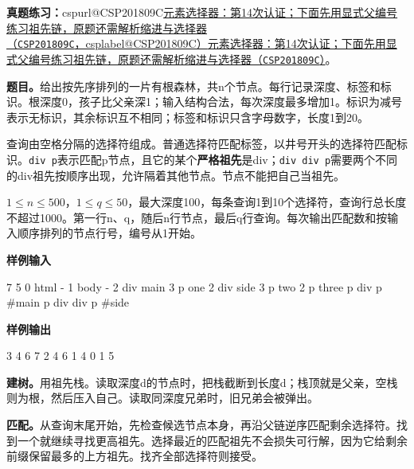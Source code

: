 \documentclass[UTF8,11pt,a4paper,fontset=none]{ctexart}
\makeatletter
\newcommand{\csp}[2]{\ifcsname cspurl@#1\endcsname\href{\csname cspurl@#1\endcsname}{#2（\texttt{#1}，\csname csplabel@#1\endcsname）}\else\href{https://oj.shumeng.tech/p/#1}{#2（\texttt{#1}）}\fi}
\newcommand{\ojpractice}[2]{\par\noindent\textbf{真题练习：}\csp{#1}{#2}。\par}
\makeatother
\begin{document}
\ojpractice{CSP201809C}{元素选择器：第14次认证；下面先用显式父编号练习祖先链，原题还需解析缩进与选择器}

\noindent\textbf{题目。}给出按先序排列的一片有根森林，共n个节点。每行记录深度、标签和标识。根深度0，孩子比父亲深1；输入结构合法，每次深度最多增加1。标识为减号表示无标识，其余标识互不相同；标签和标识只含字母数字，长度1到20。

查询由空格分隔的选择符组成。普通选择符匹配标签，以井号开头的选择符匹配标识。\texttt{div p}表示匹配p节点，且它的某个\textbf{严格祖先}是div；\texttt{div div p}需要两个不同的div祖先按顺序出现，允许隔着其他节点。节点不能把自己当祖先。

$1\le n\le500$，$1\le q\le50$，最大深度100，每条查询1到10个选择符，查询行总长度不超过1000。第一行n、q，随后n行节点，最后q行查询。每次输出匹配数和按输入顺序排列的节点行号，编号从1开始。
\begin{tcolorbox}[samplebox,title={输入输出样例}]
\textbf{样例输入}
\begin{Sample}
7 5
0 html -
1 body -
2 div main
3 p one
2 div side
3 p two
2 p three
p
div p
#main p
div div p
#side
\end{Sample}
\tcblower
\textbf{样例输出}
\begin{Sample}
3 4 6 7
2 4 6
1 4
0
1 5
\end{Sample}
\end{tcolorbox}

\noindent\textbf{建树。}用祖先栈。读取深度d的节点时，把栈截断到长度d；栈顶就是父亲，空栈则为根，然后压入自己。读取同深度兄弟时，旧兄弟会被弹出。

\noindent\textbf{匹配。}从查询末尾开始，先检查候选节点本身，再沿父链逆序匹配剩余选择符。找到一个就继续寻找更高祖先。选择最近的匹配祖先不会损失可行解，因为它给剩余前缀保留最多的上方祖先。找齐全部选择符则接受。
\end{document}
